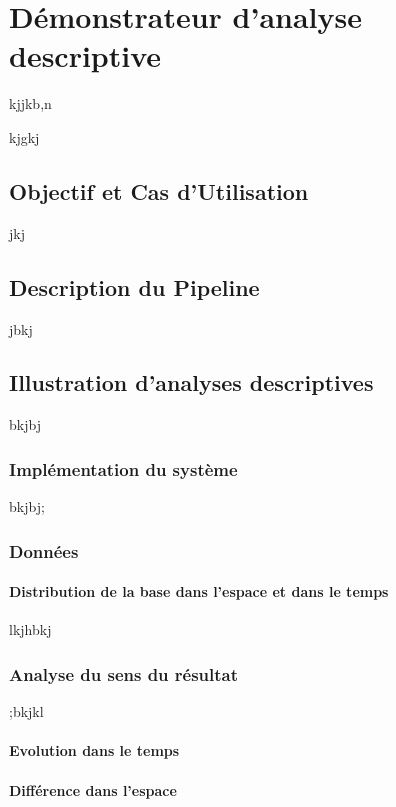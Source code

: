 \chapter{Démonstrateur d'analyse descriptive}
\label{chap:demo}

kjjkb,n


kjgkj


\section{Objectif et Cas d'Utilisation}
\label{sec:demo:objectif}

 jkj
 
 
\section{Description du Pipeline}
\label{sec:demo:motivation}

jbkj

\section{Illustration d'analyses descriptives}
\label{sec:demo:experimentations}

bkjbj


\subsection{Implémentation du système}

bkjbj;


\subsection{Données}
\subsubsection{Distribution de la base dans l'espace et dans le temps}

lkjhbkj


\subsection{Analyse du sens du résultat}
;bkjkl
\subsubsection{Evolution dans le temps}
\subsubsection{Différence dans l'espace}

